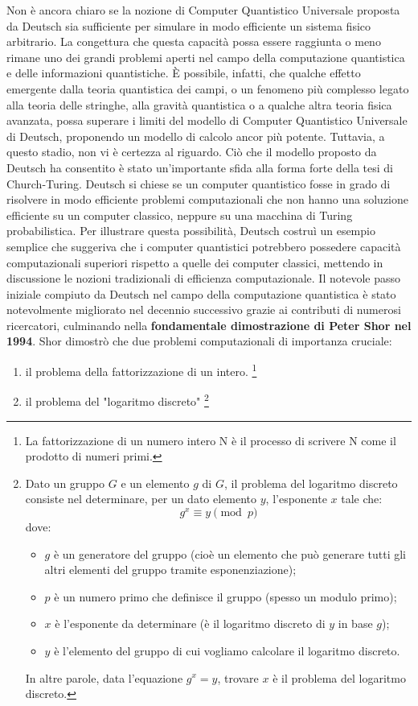 \documentclass[a4paper,12pt]{report}
\theoremstyle{plain}
\begin{document}
Non è ancora chiaro se la nozione di Computer Quantistico Universale proposta da Deutsch sia sufficiente per simulare in modo efficiente un sistema fisico arbitrario. La congettura che questa capacità possa essere raggiunta o meno rimane uno dei grandi problemi aperti nel campo della computazione quantistica e delle informazioni quantistiche. È possibile, infatti, che qualche effetto emergente dalla teoria quantistica dei campi, o un fenomeno più complesso legato alla teoria delle stringhe, alla gravità quantistica o a qualche altra teoria fisica avanzata, possa superare i limiti del modello di Computer Quantistico Universale di Deutsch, proponendo un modello di calcolo ancor più potente. 
Tuttavia, a questo stadio, non vi è certezza al riguardo. Ciò che il modello proposto da Deutsch ha consentito è stato un'importante sfida alla forma forte della tesi di Church-Turing. Deutsch si chiese se un computer quantistico fosse in grado di risolvere in modo efficiente problemi computazionali che non hanno una soluzione efficiente su un computer classico, neppure su una macchina di Turing probabilistica. 
Per illustrare questa possibilità, Deutsch costruì un esempio semplice che suggeriva che i computer quantistici potrebbero possedere capacità computazionali superiori rispetto a quelle dei computer classici, mettendo in discussione le nozioni tradizionali di efficienza computazionale. Il notevole passo iniziale compiuto da Deutsch nel campo della computazione quantistica è stato notevolmente migliorato nel decennio successivo grazie ai contributi di numerosi ricercatori, culminando nella \textbf{fondamentale dimostrazione di Peter Shor nel 1994}. 
Shor dimostrò che due problemi computazionali di importanza cruciale: 
\begin{enumerate}
  \item il problema della fattorizzazione di un intero. \footnote{La fattorizzazione di un numero intero N è il processo di scrivere N come il prodotto di numeri primi.}
  \item il problema del "logaritmo discreto" \footnote{Dato un gruppo \( G \) e un elemento \( g \) di \( G \), il problema del logaritmo discreto consiste nel determinare, per un dato elemento \( y \), l'esponente \( x \) tale che: \[g^x \equiv y \pmod{p}\] dove:
  \begin{itemize}
    \item \( g \) è un generatore del gruppo (cioè un elemento che può generare tutti gli altri elementi del gruppo tramite esponenziazione);
    \item \( p \) è un numero primo che definisce il gruppo (spesso un modulo primo);
    \item \( x \) è l'esponente da determinare (è il logaritmo discreto di \( y \) in base \( g \));
    \item \( y \) è l'elemento del gruppo di cui vogliamo calcolare il logaritmo discreto.
  \end{itemize}
  In altre parole, data l'equazione \( g^x = y \), trovare \( x \) è il problema del logaritmo discreto.}
\end{enumerate}
\end{document}
